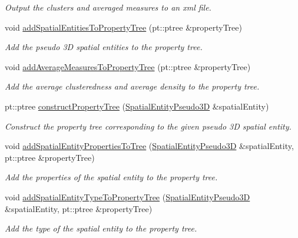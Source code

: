 \begin{DoxyCompactItemize}
\begin{DoxyCompactList}\small\item\em Output the clusters and averaged measures to an xml file. \end{DoxyCompactList}\item 
void \hyperlink{classmultiscale_1_1analysis_1_1Detector_a11bf4fa46f51ac033b635d19e92998ae}{add\-Spatial\-Entities\-To\-Property\-Tree} (pt\-::ptree \&property\-Tree)
\begin{DoxyCompactList}\small\item\em Add the pseudo 3\-D spatial entities to the property tree. \end{DoxyCompactList}\item 
void \hyperlink{classmultiscale_1_1analysis_1_1Detector_a9cfa8c84d6cb13bf6d423b1db490668d}{add\-Average\-Measures\-To\-Property\-Tree} (pt\-::ptree \&property\-Tree)
\begin{DoxyCompactList}\small\item\em Add the average clusteredness and average density to the property tree. \end{DoxyCompactList}\item 
pt\-::ptree \hyperlink{classmultiscale_1_1analysis_1_1Detector_af11495dceabe108397805a770fb9c7b4}{construct\-Property\-Tree} (\hyperlink{classmultiscale_1_1analysis_1_1SpatialEntityPseudo3D}{Spatial\-Entity\-Pseudo3\-D} \&spatial\-Entity)
\begin{DoxyCompactList}\small\item\em Construct the property tree corresponding to the given pseudo 3\-D spatial entity. \end{DoxyCompactList}\item 
void \hyperlink{classmultiscale_1_1analysis_1_1Detector_ac0e3077d43c329e409db504bf3981c3c}{add\-Spatial\-Entity\-Properties\-To\-Tree} (\hyperlink{classmultiscale_1_1analysis_1_1SpatialEntityPseudo3D}{Spatial\-Entity\-Pseudo3\-D} \&spatial\-Entity, pt\-::ptree \&property\-Tree)
\begin{DoxyCompactList}\small\item\em Add the properties of the spatial entity to the property tree. \end{DoxyCompactList}\item 
void \hyperlink{classmultiscale_1_1analysis_1_1Detector_ae166867e5af40637dbde9ac0da6dac9a}{add\-Spatial\-Entity\-Type\-To\-Property\-Tree} (\hyperlink{classmultiscale_1_1analysis_1_1SpatialEntityPseudo3D}{Spatial\-Entity\-Pseudo3\-D} \&spatial\-Entity, pt\-::ptree \&property\-Tree)
\begin{DoxyCompactList}\small\item\em Add the type of the spatial entity to the property tree. \end{DoxyCompactList}\item 

\end{DoxyCompactItemize}
